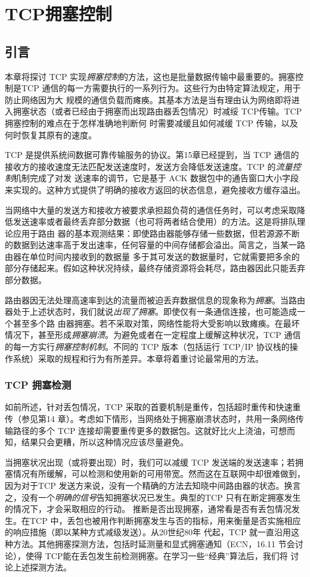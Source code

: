 \chapter{TCP拥塞控制}
\minitoc

\section{引言}
本章将探讨 TCP 实现\emph{拥塞控制}的方法，这也是批量数据传输中最重要的。拥塞控制是TCP 通信的每一方需要执行的一系列行为。这些行为由特定算法规定，用于防止网络因为大
规模的通信负载而瘫痪。其基本方法是当有理由认为网络即将进入拥塞状态（或者已经由于拥塞而出现路由器丢包情况）时减绥 TCP传输。TCP 拥塞控制的难点在于怎样准确地判断何
时需要减缓且如何减缓 TCP 传输，以及何时恢复其原有的速度。

TCP 是提供系统间数据可靠传输服务的协议。第15章已经提到，当 TCP 通信的接收方的接收速度无法匹配发送速度时，发送方会降低发送速度。TCP 的\emph{流量控制}机制完成了对发
送速率的调节，它是基于 ACK 数据包中的通告窗口大小字段来实现的。这种方式提供了明确的接收方返回的状态信息，避免接收方缓存溢出。

当网络中大量的发送方和接收方被要求承担超负荷的通信任务时，可以考虑采取降低发送速率或者最终丢弃部分数据（也可将两者结合使用）的方法。这是将排队理论应用于路由
器的基本观测结果：即使路由器能够存储一些数据，但若源源不断的数据到达速率高于发出速率，任何容量的中间存储都会溢出。简言之，当某一路由器在单位时间内接收到的数据量
多于其可发送的数据量时，它就需要把多余的部分存储起来。假如这种状况持续，最终存储资源将会耗尽，路由器因此只能丢弃部分数据。

路由器因无法处理高速率到达的流量而被迫丢弃数据信息的现象称为\emph{拥塞}。当路由器处于上述状态时，我们就说\emph{出现了拥塞}。即使仅有一条通信连接，也可能造成一个甚至多个路
由器拥塞。若不采取对策，网络性能将大受影响以致瘫痪。在最坏情况下，甚至形成\emph{拥塞崩溃}。为避免或者在一定程度上缓解这种状况，TCP 通信的每一方实行\emph{拥塞控制机制}。不同的
TCP 版本（包括运行 TCP/IP 协议栈的操作系统）采取的规程和行为有所差异。本章将着重讨论最常用的方法。
\subsection{TCP 拥塞检测}
如前所述，针对丢包情况，TCP 采取的首要机制是重传，包括超时重传和快速重传（参见第14 章）。考虑如下情形，当网络处于拥塞崩溃状态时，共用一条网络传输路径的多个
TCP 连接却需要重传更多的数据包。这就好比火上浇油，可想而知，结果只会更糟，所以这种情况应该尽量避免。

当拥塞状况出现（或将要出现）时，我们可以减缓 TCP 发送端的发送速率；若拥塞情况有所缓解，可以检测和使用新的可用带宽。然而这在互联网中却很难做到，因为对于TCP
发送方来说，没有一个精确的方法去知晓中间路由器的状态。换言之，没有一个\emph{明确的信号}告知拥塞状况已发生。典型的TCP 只有在断定拥塞发生的情况下，才会采取相应的行动。
推断是否出现拥塞，通常看是否有丢包情况发生。在TCP 中，丢包也被用作判断拥塞发生与否的指标，用来衡量是否实施相应的响应措施（即以某种方式减级发送）。从20世纪80年
代起，TCP 就一直沿用这种方法。其他拥塞探测方法，包括时延测量和显式拥塞通知（ECN，16.11 节会讨论），使得 TCP能在丢包发生前检测拥塞。在学习一些“经典”算法后，我们将
讨论上述探测方法。

